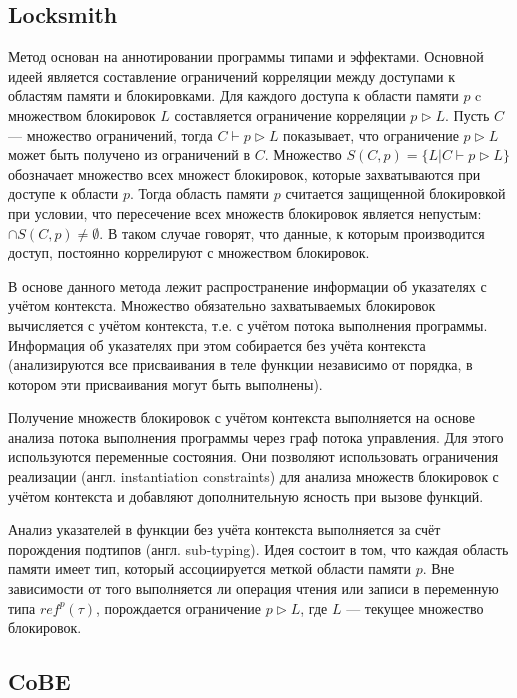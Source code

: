\subsection{Locksmith}

Метод основан на аннотировании программы типами и эффектами. Основной идеей является составление ограничений корреляции между доступами к областям памяти и блокировками. Для каждого доступа к области памяти $p$ c множеством блокировок $L$ составляется ограничение корреляции $p \triangleright L$. Пусть $C$  — множество ограничений, тогда $C \vdash p \triangleright L$ показывает, что ограничение $p \triangleright L$ может быть получено из ограничений в $C$. Множество $S(C, p) = \{L | C \vdash p \triangleright L\}$ обозначает множество всех множест блокировок, которые захватываются при доступе к области $p$. Тогда область памяти $p$ считается защищенной блокировкой при условии, что пересечение всех множеств блокировок является непустым: $\cap S(C, p) \neq \emptyset$. В таком случае говорят, что данные, к которым производится доступ, постоянно коррелируют с множеством блокировок.

В основе данного метода лежит распространение информации об указателях с учётом контекста. Множество обязательно захватываемых блокировок вычисляется с учётом контекста, т.е. с учётом потока выполнения программы. Информация об указателях при этом собирается без учёта контекста (анализируются все присваивания в теле функции независимо от порядка, в котором эти присваивания могут быть выполнены).

Получение множеств блокировок с учётом контекста выполняется на основе анализа потока выполнения программы через граф потока управления. Для этого используются переменные состояния. Они позволяют использовать ограничения реализации (англ. instantiation constraints) для анализа множеств блокировок с учётом контекста и добавляют дополнительную ясность при вызове функций.

Анализ указателей в функции без учёта контекста выполняется за счёт порождения подтипов (англ. sub-typing). Идея состоит в том, что каждая область памяти имеет тип, который ассоциируется меткой области памяти $p$. Вне зависимости от того выполняется ли операция чтения или записи в переменную типа $ref^{p}(\tau)$, порождается ограничение $p \triangleright L$, где $L$ — текущее множество блокировок.

\subsection{CoBE}


